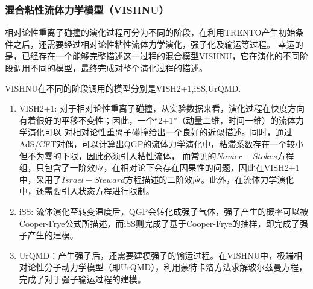 \documentclass[aps,pre,12pt,preprint,onecolumn,showpacs,showkeys]{revtex4-1}
\begin{document}
\subsubsection{混合粘性流体力学模型（VISHNU）}
相对论性重离子碰撞的演化过程可分为不同的阶段，在利用TRENTO产生初始条件之后，还需要经过相对论性粘性流体力学演化，强子化及输运等过程。
幸运的是，已经存在一个能够完整描述这一过程的混合模型VISHNU\cite{Shen:2014vra}，它在演化的不同阶段调用不同的模型，最终完成对整个演化过程的描述。\par
VISHNU在不同的阶段调用的模型分别是VISH2+1,iSS,UrQMD.
\begin{enumerate}
    \item VISH2+1: 对于相对论性重离子碰撞，从实验数据来看，演化过程在快度方向有着很好的平移不变性；因此，一个“2+1”（动量二维，时间一维）的流体力学演化可以
    对相对论性重离子碰撞给出一个良好的近似描述。同时，通过AdS/CFT对偶，可以计算出QGP的流体力学演化中，粘滞系数存在一个较小但不为零的下限，因此必须引入粘性流体，
    而常见的$Navier-Stokes$方程组，只包含了一阶效应，在相对论下会存在因果性的问题，因此在VISH2+1中，采用了$Israel-Steward$方程描述的二阶效应。此外，在流体力学演化
    中，还需要引入状态方程进行限制。
    \item iSS: 流体演化至转变温度后，QGP会转化成强子气体，强子产生的概率可以被Cooper-Frye公式所描述，而iSS则完成了基于Cooper-Frye的抽样，即完成了强子产生的建模。
    \item UrQMD：产生强子后，还需要建模强子的输运过程。在VISHNU中，极端相对论性分子动力学模型（即UrQMD），利用蒙特卡洛方法求解玻尔兹曼方程，完成了对于强子输运过程的建模。
\end{enumerate}
\end{document}
